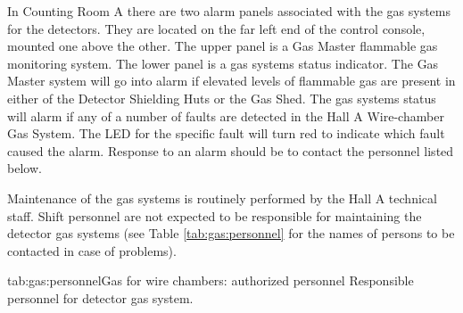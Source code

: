
In Counting Room A there are two alarm panels associated with the gas
systems for the detectors.  They are located on the far left end of the
control console, mounted one above the other.  The upper panel is a
Gas Master flammable gas monitoring system.  The lower panel is a gas
systems status indicator.  The Gas Master system will go into alarm if
elevated levels of flammable gas are present in either of the Detector
Shielding Huts or the Gas Shed.
The gas systems status will
alarm if any of a number of faults are detected in the Hall A Wire-chamber
Gas System.  The LED for the specific fault will turn red to indicate which
fault caused the alarm.
Response to an alarm should be to contact the personnel listed below.



Maintenance of the gas systems is routinely performed by the Hall A
technical staff.  Shift personnel are not expected to be responsible
for maintaining the detector gas systems (see Table \ref{tab:gas:personnel}  
for the names of persons to be contacted in case of problems). 

\begin{namestab}{tab:gas:personnel}{Gas for wire chambers: authorized personnel}{%
      Responsible personnel for detector gas system.}
  \JackSegal{}
\end{namestab}

